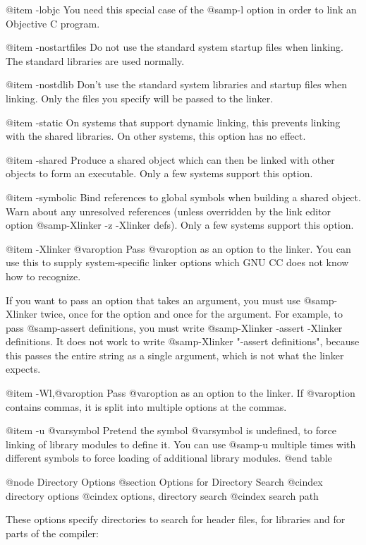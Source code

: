 {{@item -lobjc
You need this special case of the @samp{-l} option in order to
link an Objective C program.

@item -nostartfiles
Do not use the standard system startup files when linking.
The standard libraries are used normally.

@item -nostdlib
Don't use the standard system libraries and startup files when linking.
Only the files you specify will be passed to the linker.

@item -static
On systems that support dynamic linking, this prevents linking with the shared
libraries.  On other systems, this
option has no effect.

@item -shared
Produce a shared object which can then be linked with other objects to
form an executable.  Only a few systems support this option.

@item -symbolic
Bind references to global symbols when building a shared object.  Warn
about any unresolved references (unless overridden by the link editor
option @samp{-Xlinker -z -Xlinker defs}).  Only a few systems support
this option.

@item -Xlinker @var{option}
Pass @var{option} as an option to the linker.  You can use this to
supply system-specific linker options which GNU CC does not know how to
recognize.

If you want to pass an option that takes an argument, you must use
@samp{-Xlinker} twice, once for the option and once for the argument.
For example, to pass @samp{-assert definitions}, you must write
@samp{-Xlinker -assert -Xlinker definitions}.  It does not work to write
@samp{-Xlinker "-assert definitions"}, because this passes the entire
string as a single argument, which is not what the linker expects.

@item -Wl,@var{option}
Pass @var{option} as an option to the linker.  If @var{option} contains
commas, it is split into multiple options at the commas.

@item -u @var{symbol}
Pretend the symbol @var{symbol} is undefined, to force linking of
library modules to define it.  You can use @samp{-u} multiple times with
different symbols to force loading of additional library modules.
@end table

@node Directory Options
@section Options for Directory Search
@cindex directory options
@cindex options, directory search
@cindex search path

These options specify directories to search for header files, for
libraries and for parts of the compiler:

}}
